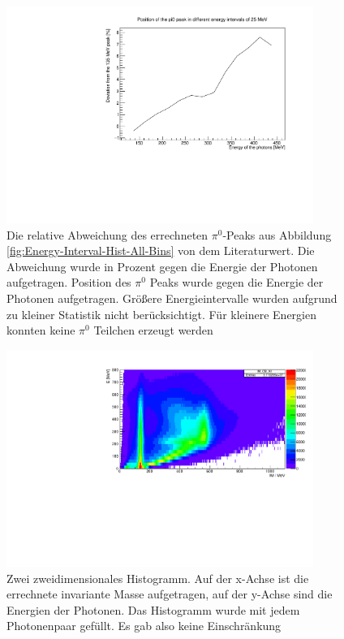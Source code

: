 \documentclass[a4paper,11pt,oneside,final,german,openbib,pdftex]{scrbook}
\begin{document}
{\begin{appendix}
\begin{figure}[h!]
	\begin{center}
		\includegraphics[width=100mm]{RealDataEnergyIntervalSymmetricPhotonsRelativeDeviation}
		
		\caption{Die relative Abweichung des errechneten $\pi^0$-Peaks aus Abbildung \ref{fig:Energy-Interval-Hist-All-Bins} von dem Literaturwert. Die Abweichung wurde in Prozent gegen die Energie der Photonen aufgetragen.  Position des $\pi^0$ Peaks wurde gegen die Energie der Photonen aufgetragen. Gr\"o{\ss}ere Energieintervalle wurden aufgrund zu kleiner Statistik nicht ber\"ucksichtigt. F\"ur kleinere Energien konnten keine $\pi^0$ Teilchen erzeugt werden}			
		\label{fig:RelativEnergyDependency}	

	\end{center}
\end{figure}

\begin{figure}[h!]
	\begin{center}
		\includegraphics[width=100mm]{RealDataEnergyIntervalAllPhotonsHist}
		\caption{Zwei zweidimensionales Histogramm. Auf der x-Achse ist die errechnete invariante Masse aufgetragen, auf der y-Achse sind die Energien der Photonen. Das Histogramm wurde mit jedem Photonenpaar gefüllt. Es gab also keine Einschränkung }
		\label{fig:Energy-Intervall-Hist-All-Energys-No-Condition}
	\end{center}
\end{figure}



\end{appendix}}
\end{document}
